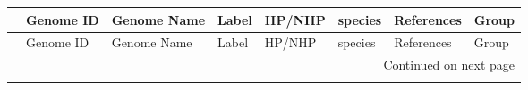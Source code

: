 \begin{longtable}{llllllll}
\toprule
{} &     Genome ID &                                                              Genome Name & Label &    HP/NHP &                                        species &                                                    References & Group \\
\midrule
\endfirsthead

\toprule
{} &     Genome ID &                                                              Genome Name & Label &    HP/NHP &                                        species &                                                    References & Group \\
\midrule
\endhead
\midrule
\multicolumn{8}{r}{{Continued on next page}} \\
\midrule
\endfoot


\end{longtable}
